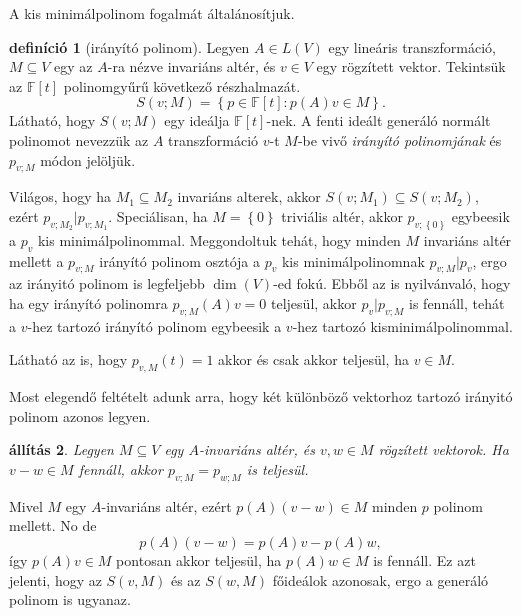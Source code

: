 \documentclass[9pt, a4paper, showtrims]{memoir}
\makeatletter
\renewenvironment{proof}[1][\proofname]
    {\par\pushQED{\qed}%
    \normalfont \topsep6\p@\@plus6\p@\relax
    \trivlist
    \item[\hskip\labelsep
        \itshape
    #1\@addpunct{:}]\ignorespaces}
    {\popQED\endtrivlist\@endpefalse}
\theoremstyle{plain}
\newtheorem{proposition}{állítás}[chapter]
\theoremstyle{remark}
\theoremstyle{definition}
\newtheorem{definition}[proposition]{definíció}
\makeatother
\begin{document}
A kis minimálpolinom fogalmát általánosítjuk.
\begin{definition}[irányító polinom]
    Legyen $A\in L\left( V \right)$ egy lineáris transzformáció,
    $M\subseteq V$ egy az $A$-ra nézve invariáns altér, 
    és $v\in V$ egy rögzített vektor.
    Tekintsük az $\mathbb{F}\left[ t \right]$ polinomgyűrű következő részhalmazát.
    \[
        S\left( v;M \right)
        =
        \left\{ p\in\mathbb{F}\left[ t \right]:p\left( A \right)v\in M \right\}.
    \]
    Látható, hogy $S\left( v;M \right)$ egy ideálja $\mathbb{F}\left[ t \right]$-nek.
    A fenti ideált generáló normált polinomot nevezzük az $A$ transzformáció $v$-t $M$-be vivő \emph{irányító polinomjának}
    és $p_{v;M}$ módon jelöljük.
\end{definition}
Világos, hogy ha $M_1\subseteq M_2$ invariáns alterek, akkor $S\left( v;M_1 \right)\subseteq S\left( v;M_2 \right)$, 
ezért $p_{v;M_2}|p_{v;M_1}$.
Speciálisan, ha $M=\left\{ 0 \right\}$ triviális altér, akkor $p_{v;\left\{ 0 \right\}}$ egybeesik a $p_{v}$ kis minimálpolinommal.
Meggondoltuk tehát, hogy minden $M$ invariáns altér mellett a $p_{v;M}$ irányító polinom osztója a $p_v$ kis minimálpolinomnak $p_{v;M}|p_v$, ergo az irányitó polinom is legfeljebb $\dim\left( V \right)$-ed fokú.
Ebből az is nyilvánvaló, hogy ha egy irányító polinomra $p_{v;M}\left( A \right)v=0$ teljesül,
akkor $p_{v}|p_{v;M}$ is fennáll, 
tehát a $v$-hez tartozó irányító polinom egybeesik a $v$-hez tartozó kisminimálpolinommal.

Látható az is, hogy $p_{v,M}\left( t \right)=1$ akkor és csak akkor teljesül, ha $v\in M$.

Most elegendő feltételt adunk arra, 
hogy két különböző vektorhoz tartozó irányitó polinom azonos legyen.
\begin{proposition}
    Legyen $M\subseteq V$ egy $A$-invariáns altér, 
    és $v,w\in M$ rögzített vektorok.
    Ha $v-w\in M$ fennáll, akkor $p_{v;M}=p_{w;M}$ is teljesül.
\end{proposition}
\begin{proof}
    Mivel $M$ egy $A$-invariáns altér, ezért $p\left( A \right)\left( v-w \right)\in M$ minden $p$ polinom mellett.
    No de
    \[
        p\left( A \right)\left( v-w \right)=p\left( A \right)v-p\left( A \right)w,
    \]
    így $p\left( A \right)v\in M$ pontosan akkor teljesül, ha $p\left( A \right)w\in M$ is fennáll.
    Ez azt jelenti, hogy az $S\left( v,M \right)$ és az $S\left( w,M \right)$ főideálok azonosak,
    ergo a generáló polinom is ugyanaz.
\end{proof}
\end{document}
